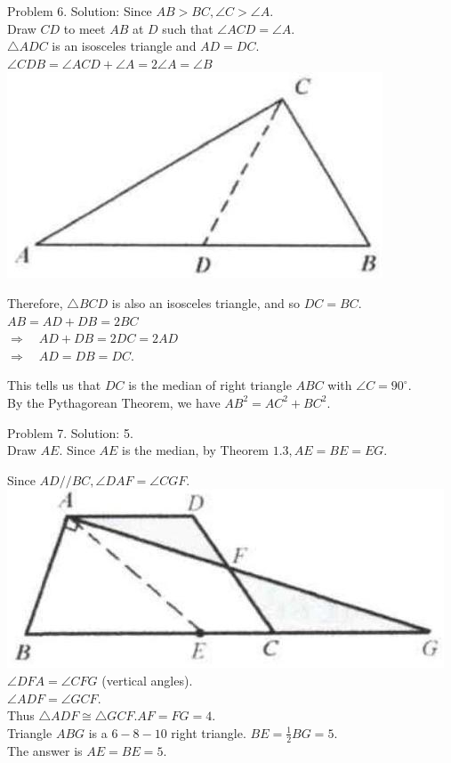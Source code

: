 \documentclass[10pt]{article}
\begin{document}
Problem 6. Solution:
Since \(A B>B C, \angle C>\angle A\).\\
Draw \(C D\) to meet \(A B\) at \(D\) such that \(\angle A C D=\angle A\).\\
\(\triangle A D C\) is an isosceles triangle and \(A D=D C\).\\
\(\angle C D B=\angle A C D+\angle A=2 \angle A=\angle B\)\\
\includegraphics[max width=\textwidth, center]{2025_04_17_97bc1f7e44d93c271a88g-019(1)}

Therefore, \(\triangle B C D\) is also an isosceles triangle, and so \(D C=B C\).\\
\(A B=A D+D B=2 B C\)\\
\(\Rightarrow \quad A D+D B=2 D C=2 A D\)\\
\(\Rightarrow \quad A D=D B=D C\).

This tells us that \(D C\) is the median of right triangle \(A B C\) with \(\angle C=90^{\circ}\).\\
By the Pythagorean Theorem, we have \(A B^{2}=A C^{2}+B C^{2}\).


Problem 7. Solution: 5.\\
Draw \(A E\). Since \(A E\) is the median, by Theorem \(1.3, A E=B E=E G\).

Since \(A D / / B C, \angle D A F=\angle C G F\).\\
\includegraphics[max width=\textwidth, center]{2025_04_17_97bc1f7e44d93c271a88g-020}\\
\(\angle D F A=\angle C F G\) (vertical angles).\\
\(\angle A D F=\angle G C F\).\\
Thus \(\triangle A D F \cong \triangle G C F . A F=F G=4\).\\
Triangle \(A B G\) is a \(6-8-10\) right triangle. \(B E=\frac{1}{2} B G=5\).\\
The answer is \(A E=B E=5\).
\end{document}
